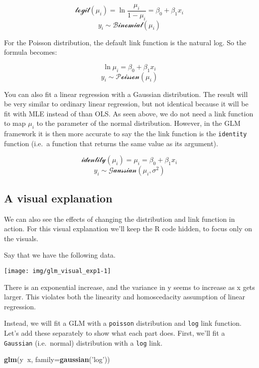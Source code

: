 \documentclass[
]{article}
\newenvironment{Shaded}{\begin{snugshade}}{\end{snugshade}}
\newcommand{\DataTypeTok}[1]{\textcolor[rgb]{0.13,0.29,0.53}{#1}}
\newcommand{\KeywordTok}[1]{\textcolor[rgb]{0.13,0.29,0.53}{\textbf{#1}}}
\newcommand{\NormalTok}[1]{#1}
\newcommand{\OperatorTok}[1]{\textcolor[rgb]{0.81,0.36,0.00}{\textbf{#1}}}
\newcommand{\StringTok}[1]{\textcolor[rgb]{0.31,0.60,0.02}{#1}}
\begin{document}
\[  \mathcal{logit}(\mu_i) = \ln{\frac{\mu_i}{1 - \mu_i}} =\beta_0 + \beta_1{x_i} \]
\[ y_i \sim \mathcal{Binomial}(\mu_i) \]

For the Poisson distribution, the default link function is the natural
log. So the formula becomes:

\[ \ln{\mu_i} = \beta_0 + \beta_1{x_i} \]
\[ y_i \sim \mathcal{Poisson}(\mu_i) \]

You can also fit a linear regression with a Gaussian distribution. The
result will be very similar to ordinary linear regression, but not
identical because it will be fit with MLE instead of than OLS. As seen
above, we do not need a link function to map \(\mu_i\) to the parameter
of the normal distribution. However, in the GLM framework it is then
more accurate to say the the link function is the \texttt{identity}
function (i.e.~a function that returns the same value as its argument).

\[ \mathcal{identity}(\mu_i) = \mu_i = \beta_0 + \beta_1{x_i} \]
\[ y_i \sim \mathcal{Gaussian}(\mu_i, \sigma^2) \]

\hypertarget{a-visual-explanation}{%
\subsection{A visual explanation}\label{a-visual-explanation}}

We can also see the effects of changing the distribution and link
function in action. For this visual explanation we'll keep the R code
hidden, to focus only on the visuals.

Say that we have the following data.

\begin{center}\texttt{[image: img/glm\_visual\_exp1-1]} \end{center}

There is an exponential increase, and the variance in y seems to
increase as x gets larger. This violates both the linearity and
homoscedacity assumption of linear regression.

Instead, we will fit a GLM with a \texttt{poisson} distribution and
\texttt{log} link function. Let's add these separately to show what each
part does. First, we'll fit a \texttt{Gaussian} (i.e.~normal)
distribution with a \texttt{log} link.

\begin{Shaded}
\begin{Highlighting}[]
\KeywordTok{glm}\NormalTok{(y}\OperatorTok{~}\NormalTok{x, }\DataTypeTok{family=}\KeywordTok{gaussian}\NormalTok{(}\StringTok{'log'}\NormalTok{))}
\end{Highlighting}
\end{Shaded}
\end{document}
